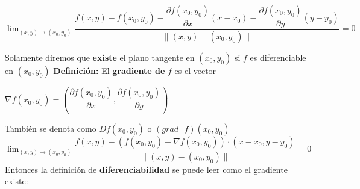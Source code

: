 \documentclass[12pt]{article}
\begin{document}
    ${\lim_{(x,y)\rightarrow(x_0,y_0)}{\dfrac{f(x,y)-f(x_0,y_0)-\dfrac{\partial f(x_0,y_0)}{\partial x}{(x-x_0)}-\dfrac{\partial f(x_0,y_0)}{\partial y}{(y-y_0)}}{\|(x,y)-(x_0,y_0)\|}}=0}$


\noindent Solamente diremos que \textbf{existe} el plano tangente en $(x_0,y_0)$ si $f$ es diferenciable en $(x_0,y_0)$
\newline
\noindent \textbf{Definición:} El \textbf{gradiente de }$f$ es el vector
\begin{center}
    $\nabla f(x_0,y_0)=\left(\dfrac{\partial f(x_0,y_0)}{\partial x},\dfrac{\partial f(x_0,y_0)}{\partial y} \right)$
\end{center}
\noindent También se denota como $Df(x_0,y_0)$ o $(grad\text{ }f)(x_0,y_0)$
${\lim_{(x,y)\rightarrow(x_0,y_0)}{\dfrac{f(x,y)-\left(f(x_0,y_0)-\nabla f(x_0,y_0)\right)\cdot\left(x-x_0,y-y_0\right)}{\|(x,y)-(x_0,y_0)\|}}=0}$
Entonces la definición de \textbf{diferenciabilidad} se puede leer como el gradiente existe:
\end{document}
